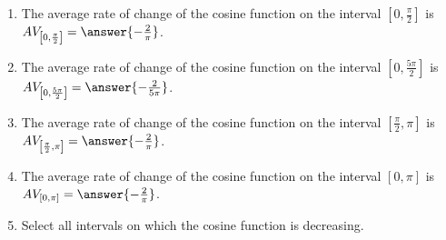 \documentclass{ximera}
\author{Kenneth Berglund}
\begin{document}
\licenseAPC
\begin{exercise}
\begin{enumerate}
\item The average rate of change of the cosine function on the interval $\left[0, \frac{\pi}{2}\right]$ is $AV_{\left[0, \frac{\pi}{2}\right]} = \answer{-\frac{2}{\pi}}$.

\item The average rate of change of the cosine function on the interval $\left[0, \frac{5\pi}{2}\right]$ is $AV_{\left[0, \frac{5\pi}{2}\right]} = \answer{-\frac{2}{5\pi}}$.

\item The average rate of change of the cosine function on the interval $\left[\frac{\pi}{2}, 
\pi\right]$ is $AV_{\left[\frac{\pi}{2}, \pi\right]} = \answer{-\frac{2}{\pi}}$.

\item The average rate of change of the cosine function on the interval $\left[0, 
\pi\right]$ is $AV_{\left[0, \pi\right]} = \answer{-\frac{2}{\pi}}$.

\item Select all intervals on which the cosine function is decreasing.
\begin{selectAll}
\end{selectAll}
\end{enumerate}

\end{exercise}
\end{document}
